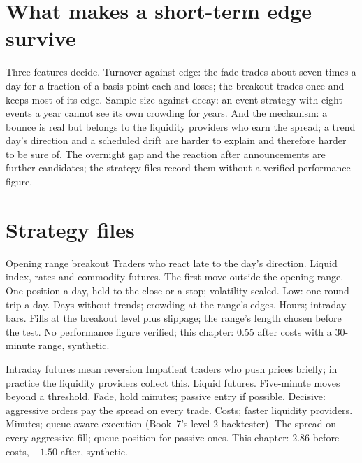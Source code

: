 \section{What makes a short-term edge survive}

Three features decide. Turnover against edge: the fade trades about seven times a day for a fraction of a basis point each and loses; the breakout trades
once and keeps most of its edge. Sample size against decay: an event strategy with eight events a year cannot see its own crowding for years. And the
mechanism: a bounce is real but belongs to the liquidity providers who earn the spread; a trend day's direction and a scheduled drift are harder to
explain and therefore harder to be sure of. The overnight gap and the reaction after announcements are further candidates; the strategy files record
them without a verified performance figure.

\section{Strategy files}

\begin{strategyfile}{Opening range breakout}\label{strat:s1:short-term-futures-strategies:orb}
 Traders who react late to the day's direction.
 Liquid index, rates and commodity futures.
 The first move outside the opening range.
 One position a day, held to the close or a stop; volatility-scaled.
 Low: one round trip a day.
 Days without trends; crowding at the range's edges.
 Hours; intraday bars.
 Fills at the breakout level plus slippage; the range's length chosen before the test.
 No performance figure verified; this chapter: 0.55 after costs with a 30-minute range, synthetic.
\end{strategyfile}

\begin{strategyfile}{Intraday futures mean reversion}\label{strat:s1:short-term-futures-strategies:mr}
 Impatient traders who push prices briefly; in practice the liquidity providers collect this.
 Liquid futures.
 Five-minute moves beyond a threshold.
 Fade, hold minutes; passive entry if possible.
 Decisive: aggressive orders pay the spread on every trade.
 Costs; faster liquidity providers.
 Minutes; queue-aware execution (Book~7's level-2 backtester).
 The spread on every aggressive fill; queue position for passive ones.
 This chapter: 2.86 before costs, $-1.50$ after, synthetic.
\end{strategyfile}

